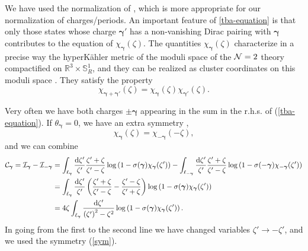 \documentclass[a4paper,11pt]{article}
\theoremstyle{definition}
\newcommand{\CC}{{\cal C}}
\newcommand{\CI}{{\cal I}}
\newcommand{\CN}{{\cal N}}
\def\IR{{\mathbb R}}
\def\IS{{\mathbb S}}
\newcommand{\rd}{{\rm d}}
\newcommand{\bs}{\boldsymbol}
\newcommand{\ba}{\begin{aligned}}
\newcommand{\ea}{\end{aligned}}
\def\IR{\mathbb{R}}
\begin{document}
%
%
%
We have used the normalization of \cite{cdorey}, which is more
appropriate for our normalization of charges/periods. An important
feature of \eqref{tba-equation} is that only those states whose charge
$\bs{\gamma'}$ has a non-vanishing Dirac pairing with $\bs{\gamma}$
contributes to the equation of $\chi_{\bs{\gamma}}(\zeta)$.  The
quantities $\chi_{\bs{\gamma}}(\zeta)$ characterize in a precise way
the hyperK\"ahler metric of the moduli space of the $\CN=2$ theory
compactified on $\IR^3 \times \IS^1_R$, and they can be realized as
cluster coordinates on this moduli space \cite{gmn2}. They satisfy the
property
%
\begin{equation}
  \label{product}
  \chi_{\bs{\gamma}+\bs{\gamma}'}(\zeta) =
  \chi_{\bs{\gamma}}(\zeta)\chi_{\bs{\gamma}'}(\zeta). 
\end{equation}
%
 
Very often we have both charges $\pm \bs{\gamma}$ appearing in the sum
in the r.h.s. of (\ref{tba-equation}). If $\theta_{\bs{\gamma}}=0$, we
have an extra symmetry \cite{oper},
%
\begin{equation}
\label{sym}
\chi_{\bs{\gamma}}(\zeta)=\chi_{-\bs{\gamma}}(-\zeta), 
\end{equation}
%
and we can combine
 \begin{equation}
   \ba
   \label{cintegral}
   \CC_{\bs{\gamma}}= \CI_{\bs{\gamma}} -\CI_{-\bs{\gamma}}
   &=
   \int_{\ell_{\bs{\gamma}}} {\rd \zeta' \over \zeta'} {\zeta '+\zeta
     \over \zeta'- \zeta} \log\left(1- \sigma(\bs{\gamma})
     \chi_{\bs{\gamma}} (\zeta') \right)-
   \int_{\ell_{-\bs{\gamma}}} {\rd \zeta' \over \zeta'} {\zeta '+\zeta
     \over \zeta'- \zeta} \log\left(1- \sigma(-\bs{\gamma})
     \chi_{-\bs{\gamma}} (\zeta') \right)\\
   &= \int_{\ell_{\bs{\gamma}}} {\rd \zeta' \over \zeta'} \left(
     {\zeta '+\zeta \over \zeta'- \zeta}-{\zeta '-\zeta \over \zeta'+
       \zeta} \right) \log\left(1- \sigma(\bs{\gamma})
     \chi_{\bs{\gamma}} (\zeta') \right)\\
   &=4 \zeta  \int_{\ell_{\bs{\gamma}}} {\rd \zeta' \over \left(
       \zeta' \right)^2-\zeta^2} \log\left(1- \sigma(\bs{\gamma})
     \chi_{\bs{\gamma}} (\zeta') \right).  
   \ea 
\end{equation}
In going from the first to the second line we have changed variables
$\zeta'\rightarrow -\zeta'$, and we used the symmetry (\ref{sym}).
 
\end{document}
